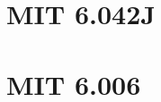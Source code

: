 \documentclass[12pt]{article}
\begin{document}
\section{MIT 6.042J}


\section{MIT 6.006}


% 
%
% 
%
% 
%
% 
\end{document}
